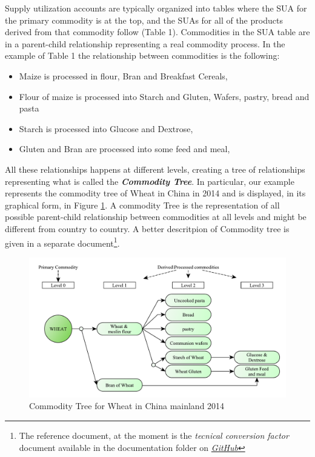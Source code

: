\documentclass[]{article}
\providecommand{\tightlist}{%
  \setlength{\itemsep}{0pt}\setlength{\parskip}{0pt}}
\let\rmarkdownfootnote\footnote%
\def\footnote{\protect\rmarkdownfootnote}
\begin{document}
Supply utilization accounts are typically organized into tables where
the SUA for the primary commodity is at the top, and the SUAs for all of
the products derived from that commodity follow (Table 1). Commodities
in the SUA table are in a parent-child relationship representing a real
commodity process. In the example of Table 1 the relationship between
commodities is the following:

\begin{itemize}
\tightlist
\item
  Maize is processed in flour, Bran and Breakfast Cereals,
\item
  Flour of maize is processed into Starch and Gluten, Wafers, pastry,
  bread and pasta
\item
  Starch is processed into Glucose and Dextrose,
\item
  Gluten and Bran are processed into some feed and meal,
\end{itemize}

All these relationships happens at different levels, creating a tree of
relationships representing what is called the \textbf{\emph{Commodity
Tree}}. In particular, our example represents the commodity tree of
Wheat in China in 2014 and is displayed, in its graphical form, in
Figure \ref{fig:f2}. A commodity Tree is the representation of all
possible parent-child relationship between commodities at all levels and
might be different from country to country. A better descritpion of
Commodity tree is given in a separate document\footnote{The reference
  document, at the moment is the \emph{tecnical conversion factor}
  document available in the documentation folder on
  \href{https://github.com/SWS-Methodology/faoswsStandardization/tree/master/documentation}{\emph{GitHub}}}.

\begin{figure}[htbp]
\centering
\includegraphics{images/02_WheatTree.pdf}
\caption{\label{fig:f2}Commodity Tree for Wheat in China mainland 2014}
\end{figure}
\end{document}
